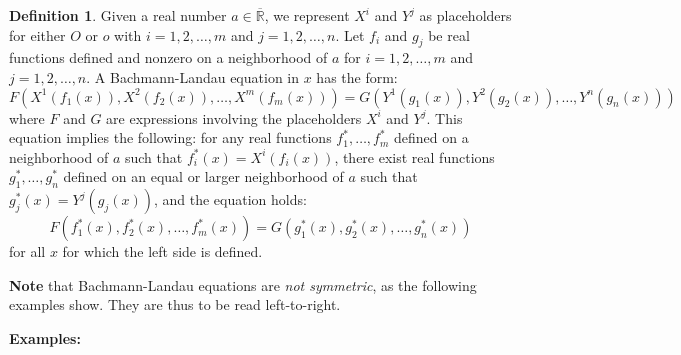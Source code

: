 \documentclass[9pt]{report}
\theoremstyle{definition}
\newtheorem{definition}{Definition}
\newcommand\RRE{\overline{\mathbb R}}
\begin{document}
\begin{definition}
Given a real number \(a \in \RRE\), we represent \(X^i\) and \(Y^j\) as placeholders for either \(O\) or \(o\) with \(i=1,2,\ldots,m\) and \(j=1,2,\ldots,n\).
Let \(f_i\) and \(g_j\) be real functions defined and nonzero on a neighborhood of \(a\) for \(i=1,2,\ldots,m\) and \(j=1,2,\ldots,n\).
A Bachmann-Landau equation in \(x\) has the form:
\[F(X^1(f_1(x)), X^2(f_2(x)), \ldots, X^m(f_m(x))) = G(Y^1(g_1(x)), Y^2(g_2(x)), \ldots, Y^n(g_n(x)))\]
where \(F\) and \(G\) are expressions involving the placeholders \(X^i\) and \(Y^j\).
This equation implies the following: for any real functions \(f_1^*, \ldots, f_m^*\) defined on a neighborhood of \(a\) such that \(f_i^*(x) = X^i(f_i(x))\), there exist real functions \(g_1^*, \ldots, g_n^*\) defined on an equal or larger neighborhood of \(a\) such that \(g_j^*(x) = Y^j(g_j(x))\), and the equation holds:
\[F(f_1^*(x), f_2^*(x), \ldots, f_m^*(x)) = G(g_1^*(x), g_2^*(x), \ldots, g_n^*(x))\]
for all \(x\) for which the left side is defined.
\end{definition}


\textbf{Note} that Bachmann-Landau equations are \textit{not symmetric}, as the following examples show.
They are thus to be read left-to-right.

\textbf{Examples:}
\end{document}
